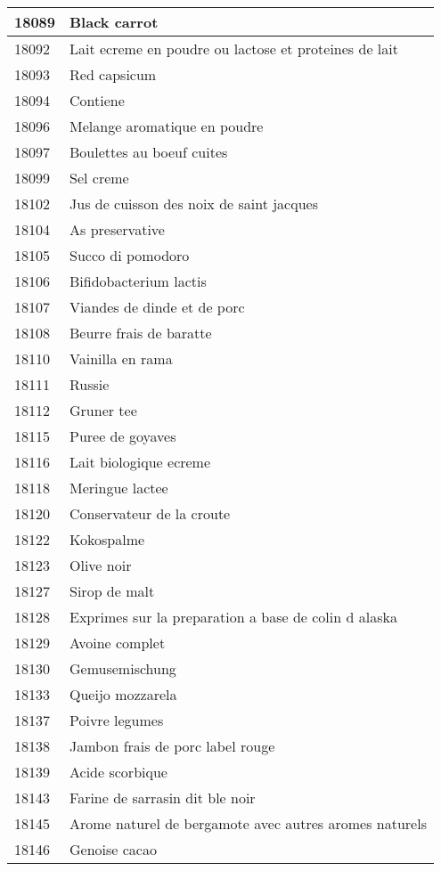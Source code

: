 \begin{longtable}{|l|l|}
18089 & Black carrot \\ \hline 
18092 & Lait ecreme en poudre ou lactose et proteines de lait \\ \hline 
18093 & Red capsicum \\ \hline 
18094 & Contiene \\ \hline 
18096 & Melange aromatique en poudre \\ \hline 
18097 & Boulettes au boeuf cuites \\ \hline 
18099 & Sel creme \\ \hline 
18102 & Jus de cuisson des noix de saint jacques \\ \hline 
18104 & As preservative \\ \hline 
18105 & Succo di pomodoro \\ \hline 
18106 & Bifidobacterium lactis \\ \hline 
18107 & Viandes de dinde et de porc \\ \hline 
18108 & Beurre frais de baratte \\ \hline 
18110 & Vainilla en rama \\ \hline 
18111 & Russie \\ \hline 
18112 & Gruner tee \\ \hline 
18115 & Puree de goyaves \\ \hline 
18116 & Lait biologique ecreme \\ \hline 
18118 & Meringue lactee \\ \hline 
18120 & Conservateur de la croute \\ \hline 
18122 & Kokospalme \\ \hline 
18123 & Olive noir \\ \hline 
18127 & Sirop de malt \\ \hline 
18128 & Exprimes sur la preparation a base de colin d alaska \\ \hline 
18129 & Avoine complet \\ \hline 
18130 & Gemusemischung \\ \hline 
18133 & Queijo mozzarela \\ \hline 
18137 & Poivre legumes \\ \hline 
18138 & Jambon frais de porc label rouge \\ \hline 
18139 & Acide scorbique \\ \hline 
18143 & Farine de sarrasin dit ble noir \\ \hline 
18145 & Arome naturel de bergamote avec autres aromes naturels \\ \hline 
18146 & Genoise cacao \\ \hline 

\end{longtable}
